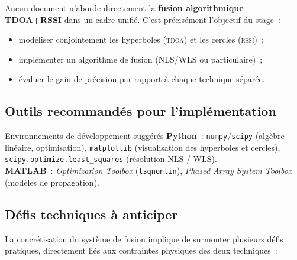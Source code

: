 \documentclass[12pt, a4paper]{article}
\newcommand{\TDOA}{\textsc{tdoa}}
\newcommand{\RSSI}{\textsc{rssi}}
\begin{document}
Aucun document n'aborde directement la \textbf{fusion algorithmique TDOA+RSSI}
dans un cadre unifié. C'est précisément l'objectif du stage~:

\begin{itemize}
  \item modéliser conjointement les hyperboles (\TDOA{}) et les cercles (\RSSI{})~;
  \item implémenter un algorithme de fusion (NLS/WLS ou particulaire)~;
  \item évaluer le gain de précision par rapport à chaque technique séparée.
\end{itemize}

\subsection{Outils recommandés pour l'implémentation}

\begin{summarybox}{Environnements de développement suggérés}
\textbf{Python}~: \texttt{numpy}/\texttt{scipy} (algèbre linéaire, optimisation),
\texttt{matplotlib} (visualisation des hyperboles et cercles),
\texttt{scipy.optimize.least\_squares} (résolution NLS / WLS).\\[4pt]
\textbf{MATLAB}~: \textit{Optimization Toolbox} (\texttt{lsqnonlin}),
\textit{Phased Array System Toolbox} (modèles de propagation).
\end{summarybox}

\subsection{Défis techniques à anticiper}

La concrétisation du système de fusion implique de surmonter plusieurs défis
pratiques, directement liés aux contraintes physiques des deux techniques~:
\end{document}
